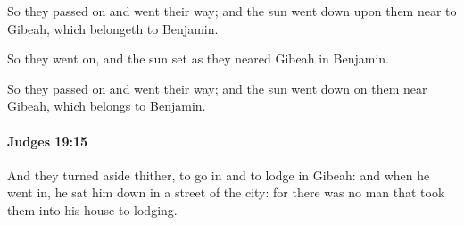 			\begin{versebox}
					\item[BHS] 
					\item[ASV] So they passed on and went their way; and the sun went down upon them near to Gibeah, which belongeth to Benjamin.
					\item[NIV] So they went on, and the sun set as they neared Gibeah in Benjamin.
					\item[NRSV] So they passed on and went their way; and the sun went down on them near Gibeah, which belongs to Benjamin.
			\end{versebox}

		\paragraph{Judges 19:15} %
			\label{JUDGES-19-15}

			And they turned aside thither, to go in and to lodge in Gibeah: and when he went in, he sat him down in a street of the city: for there was no man that took them into his house to lodging.

